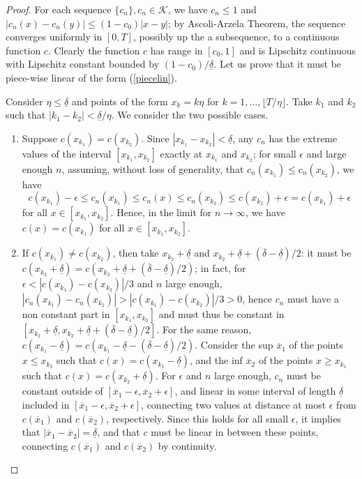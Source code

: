 \documentclass{amsart}
\begin{document}
\begin{proof}
For each sequence $\{c_n\}, c_n \in \mathcal{K}$,  we have 
$c_n\leq 1$ and $|c_n(x)-c_n(y)|\leq (1-c_0)|x-y|$; by Ascoli-Arzela Theorem, the sequence converges uniformly in $[0,T]$, possibly up the a subsequence,   to a continuous function $c$. Clearly the function $c$ has range in $[c_0,1]$ and is Lipschitz continuous with Lipschitz constant bounded by $(1-c_0)/\underline \delta$. Let us prove that it must be piece-wise linear of the form (\ref{piecelin}).

Consider $\eta \leq \underline \delta$ and points of the form 
$x_k=k \eta$ for $k=1,\dots,\lfloor T/\eta\rfloor$.
Take $k_1$ and $k_2$ such that $|k_1-k_2|<\underline \delta/\eta$.
 We consider the two possible cases.
\begin{enumerate}
    \item Suppose  $c(x_{k_1})=c(x_{k_2})$. Since
    $|x_{k_1}-x_{k_2}| <\underline \delta$, any $c_n$ has the extreme values of the interval $[x_{k_1},x_{k_2}]$ exactly 
    at $x_{k_1}$ and $x_{k_2}$;  
     for small
    $\epsilon$ and large enough $n$, assuming, without loss of
    generality, that $c_n(x_{k_1}) \leq c_n(x_{k_2})$, we have 
    $$
    c(x_{k_1})-\epsilon \leq
    c_n(x_{k_1}) \leq c_n(x) \leq c_n(x_{k_2})
    \leq c(x_{k_2})+\epsilon=c(x_{k_1})+\epsilon
    $$
    for all $x\in [x_{k_1}, x_{k_2}]$. Hence, 
    in the limit for $n \to \infty$, we have $c(x)=c(x_{k_1})$
    for all $x\in [x_{k_1}, x_{k_2}]$.
    \item If $c(x_{k_1})\neq c(x_{k_2})$,
    then take $x_{k_2}+\underline \delta$ and $x_{k_2}+\underline \delta+(\overline \delta-\underline \delta)/2 $:
    it must be $c(x_{k_2}+\underline \delta)=c(x_{k_2}
    + \underline \delta+(\overline \delta-\underline \delta)/2)$;
    in fact, for $\epsilon < |c(x_{k_1})- c(x_{k_2})|/3$
    and $n$ large enough, $|c_n(x_{k_1})- c_n(x_{k_2})|
    >|c(x_{k_1})- c(x_{k_2})|/3 >0$, hence $c_n$ must have
    a non constant part in $[x_{k_1},x_{k_2}]$ 
    and must thus be constant in $[x_{k_2}+\underline \delta,x_{k_2}+\underline \delta+(\overline \delta-\underline \delta)/2]$.
    For the same reason,  $c(x_{k_1}-\underline \delta)=c(x_{k_1}-\underline \delta-(\overline \delta-\underline \delta)/2)$.
    Consider the sup $\overline x_1$ of the points $x \leq x_{k_2}$ such
    that $c(x)=c(x_{k_1}-\underline \delta)$, and the inf $\overline x_2$
    of the points $x\geq x_{k_1}$ such that $c(x)=c(x_{k_2}+\underline \delta)$. 
    For  $\epsilon$ and $n$ large enough, $c_n$ must
    be constant outside of $[\overline x_1-\epsilon,
    \overline x_2 + \epsilon]$, and linear in some interval of 
    length $\underline \delta$ included in $[\overline x_1-\epsilon,
    \overline x_2 + \epsilon]$, connecting two values
    at distance at most $\epsilon$ from $c(\overline x_1)$
    and $c(\overline x_2)$, respectively. 
    Since this holds for all small $\epsilon$,
    it implies that $|\overline x_1-\overline x_2|=\underline \delta$,
    and that $c$ must be linear in between these points, connecting 
    $c(\overline x_1)$
    and $c(\overline x_2)$ by continuity.
    

\end{enumerate}
\end{proof}
\end{document}
